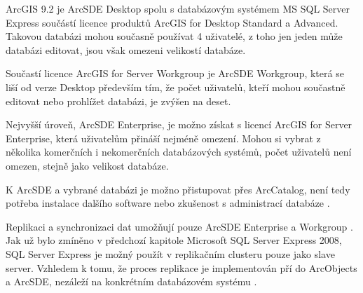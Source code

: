         ArcGIS 9.2 je ArcSDE Desktop spolu s databázovým systémem MS SQL Server Express
        součástí licence produktů ArcGIS for Desktop Standard a Advanced. Takovou
        databázi mohou současně používat 4 uživatelé, z toho jen jeden může databázi
        editovat, jsou však omezeni velikostí databáze.

        Součastí licence ArcGIS for Server Workgroup je ArcSDE Workgroup, která se liší
        od verze Desktop především tím, že počet uživatelů, kteří mohou součastně
        editovat nebo prohlížet databázi, je zvýšen na deset.

        Nejvyšší úroveň, ArcSDE Enterprise, je možno získat s licencí ArcGIS for Server
        Enterprise, která uživatelům přináší nejméně omezení. Mohou si vybrat z
        několika komerčních i nekomerčních databázových systémů, počet uživatelů není
        omezen, stejně jako velikost databáze.

        K ArcSDE a vybrané databázi je možno přistupovat přes ArcCatalog, není tedy
        potřeba instalace dalšího software nebo zkušenost s administrací databáze
        \citep{Esri2006}.

        Replikaci a synchronizaci dat umožňují pouze ArcSDE Enterprise a Workgroup
        \citep{Esri2013b}. Jak už bylo zmíněno v předchozí kapitole  Microsoft SQL
        Server Express 2008, SQL Server Express je možný použít v replikačním clusteru
        pouze jako slave server. Vzhledem k tomu, že proces replikace je implementován
        pří do ArcObjects a ArcSDE, nezáleží na konkrétním databázovém systému
        \citep{Law2008}.


